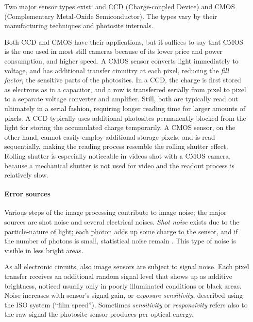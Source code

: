Two major sensor types exist: and CCD (Charge-coupled Device) and CMOS (Complementary Metal-Oxide Semiconductor).
The types vary by their manufacturing techniques and photosite internals. \cite{taylor1998ccd,el2005cmos}

Both CCD and CMOS have their applications, but it suffices to say that CMOS is the one used in most still cameras because of its lower price and power consumption, and higher speed.
A CMOS sensor converts light immediately to voltage, and has additional transfer circuitry at each pixel, reducing the \emph{fill factor}, the sensitive parts of the photosites.
In a CCD, the charge is first stored as electrons as in a capacitor, and a row is transferred serially from pixel to pixel to a separate voltage converter and amplifier.
Still, both are typically read out ultimately in a serial fashion, requiring longer reading time for larger amounts of pixels.
A CCD typically uses additional photosites permanently blocked from the light for storing the accumulated charge temporarily.
A CMOS sensor, on the other hand, cannot easily employ additional storage pixels, and is read sequentially, making the reading process resemble the rolling shutter effect.
Rolling shutter is especially noticeable in videos shot with a CMOS camera, because a mechanical shutter is not used for video and the readout process is relatively slow.
\cite{taylor1998ccd,caspeelectronic,litwiller2001ccd}

\paragraph{Error sources}
Various steps of the image processing contribute to image noise; the major sources are shot noise and several electrical noises.
\emph{Shot noise} exists due to the particle-nature of light; each photon adds up some charge to the sensor, and if the number of photons is small, statistical noise remain \cite{?}.
This type of noise is visible in less bright areas.

As all electronic circuits, also image sensors are subject to signal noise. %
Each pixel transfer receives an additional random signal level that shows up as additive brightness, noticed usually only in poorly illuminated conditions or black areas.
Noise increases with sensor's signal gain, or \emph{exposure sensitivity}, described using the ISO system (``film speed'').
Sometimes \emph{sensitivity} or \emph{responsivity} refers also to the raw signal the photosite sensor produces per optical energy. \cite{litwiller2001ccd}

